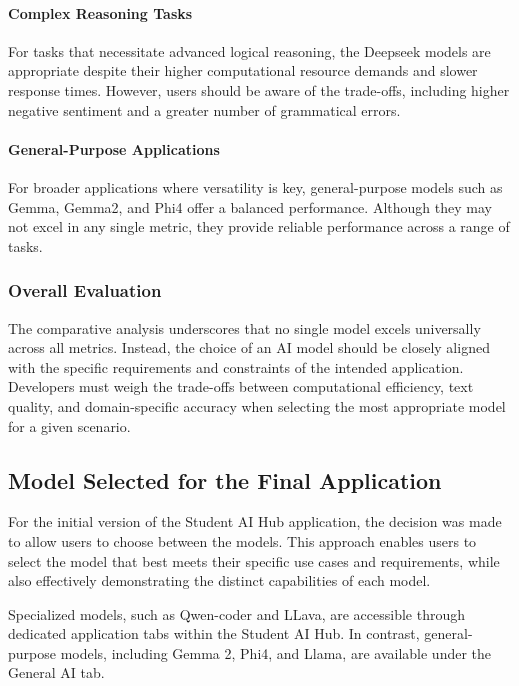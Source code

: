 \paragraph{Complex Reasoning Tasks} 
For tasks that necessitate advanced logical reasoning, the Deepseek models are appropriate despite their higher computational resource demands and slower response times. However, users should be aware of the trade-offs, including higher negative sentiment and a greater number of grammatical errors.

\paragraph{General-Purpose Applications} 
For broader applications where versatility is key, general-purpose models such as Gemma, Gemma2, and Phi4 offer a balanced performance. Although they may not excel in any single metric, they provide reliable performance across a range of tasks.

\subsubsection{Overall Evaluation}

The comparative analysis underscores that no single model excels universally across all metrics. Instead, the choice of an AI model should be closely aligned with the specific requirements and constraints of the intended application. Developers must weigh the trade-offs between computational efficiency, text quality, and domain-specific accuracy when selecting the most appropriate model for a given scenario.

\subsection{Model Selected for the Final Application}

For the initial version of the Student AI Hub application, the decision was made to allow users to choose between the models. This approach enables users to select the model that best meets their specific use cases and requirements, while also effectively demonstrating the distinct capabilities of each model.

Specialized models, such as Qwen-coder and LLava, are accessible through dedicated application tabs within the Student AI Hub. In contrast, general-purpose models, including Gemma 2, Phi4, and Llama, are available under the General AI tab.

